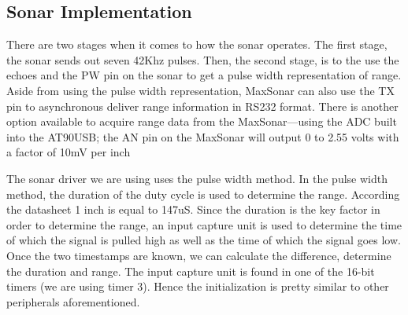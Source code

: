 \subsection{Sonar Implementation}
There are two stages when it comes to how the sonar operates. The first stage, the sonar sends out seven 42Khz pulses. Then, the second stage, is to the use the echoes and the PW pin on the sonar to get a pulse width representation of range. Aside from using the pulse width representation, MaxSonar can also use the TX pin to asynchronous deliver range information in RS232 format. There is another option available to acquire range data from the MaxSonar---using the ADC built into the AT90USB; the AN pin on the MaxSonar will output 0 to 2.55 volts with a factor of 10mV per inch

The sonar driver we are using uses the pulse width method. In the pulse width method, the duration of the duty cycle is used to determine the range. According the datasheet 1 inch is equal to 147uS. Since the duration is the key factor in order to determine the range, an input capture unit is used to determine the time of which the signal is pulled high as well as the time of which the signal goes low. Once the two timestamps are known, we can calculate the difference, determine the duration and range. The input capture unit is found in one of the 16-bit timers (we are using timer 3). Hence the initialization is pretty similar to other peripherals aforementioned.

